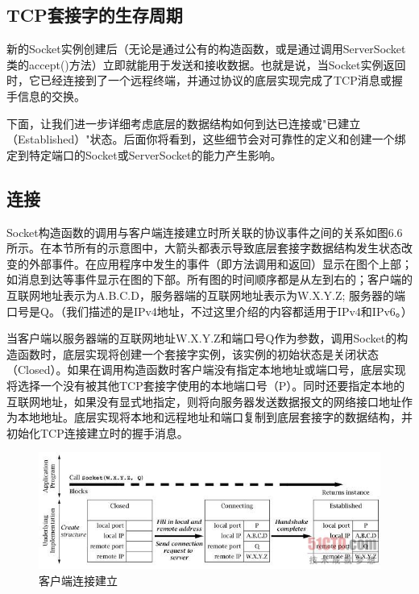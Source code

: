 	\subsection{TCP套接字的生存周期}

		新的Socket实例创建后（无论是通过公有的构造函数，或是通过调用ServerSocket类的accept()方法）立即就能用于发送和接收数据。也就是说，当Socket实例返回时，它已经连接到了一个远程终端，并通过协议的底层实现完成了TCP消息或握手信息的交换。

		下面，让我们进一步详细考虑底层的数据结构如何到达已连接或"已建立（Established）"状态。后面你将看到，这些细节会对可靠性的定义和创建一个绑定到特定端口的Socket或ServerSocket的能力产生影响。

		\subsection{连接}

		Socket构造函数的调用与客户端连接建立时所关联的协议事件之间的关系如图6.6所示。在本节所有的示意图中，大箭头都表示导致底层套接字数据结构发生状态改变的外部事件。在应用程序中发生的事件（即方法调用和返回）显示在图个上部；如消息到达等事件显示在图的下部。所有图的时间顺序都是从左到右的；客户端的互联网地址表示为A.B.C.D，服务器端的互联网地址表示为W.X.Y.Z; 服务器的端口号是Q。（我们描述的是IPv4地址，不过这里介绍的内容都适用于IPv4和IPv6。）

		当客户端以服务器端的互联网地址W.X.Y.Z和端口号Q作为参数，调用Socket的构造函数时，底层实现将创建一个套接字实例，该实例的初始状态是关闭状态（Closed）。如果在调用构造函数时客户端没有指定本地地址或端口号，底层实现将选择一个没有被其他TCP套接字使用的本地端口号（P）。同时还要指定本地的互联网地址，如果没有显式地指定，则将向服务器发送数据报文的网络接口地址作为本地地址。底层实现将本地和远程地址和端口复制到底层套接字的数据结构，并初始化TCP连接建立时的握手消息。

		\begin{figure}[htbp]%
			\centering
			\includegraphics[scale=.6]{img/06.06.jpg}
			\caption{客户端连接建立}
			\label{fig:client.create.connection}
		\end{figure}

